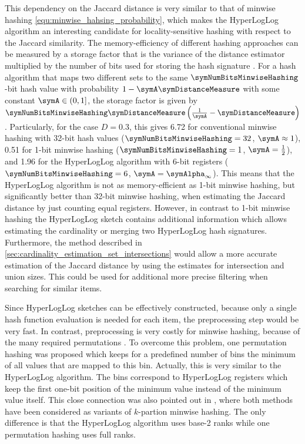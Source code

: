 \documentclass[a4paper]{scrartcl}
\begin{document}
This dependency on the Jaccard distance is very similar to that of minwise hashing \eqref{equ:minwise_hahsing_probability}, which makes the
HyperLogLog algorithm an interesting candidate for locality-sensitive hashing with respect to the Jaccard similarity. The memory-efficiency of different hashing approaches can be measured by a storage factor that is the variance of the distance estimator multiplied by the number of bits used for storing the hash signature \cite{Li2011}. For a hash algorithm that maps two different sets to the same $\symNumBitsMinwiseHashing$-bit hash value with probability $1-\symA\symDistanceMeasure$ with some constant $\symA\in(0,1]$, the storage factor is given by $\symNumBitsMinwiseHashing\symDistanceMeasure\left(\frac{1}{\symA}-\symDistanceMeasure\right)$. 
Particularly, for the case $D=0.3$, this gives \num{6.72} for conventional minwise hashing with 32-bit hash values ($\symNumBitsMinwiseHashing=32$, $\symA\approx 1$), \num{0.51} for 1-bit minwise hashing ($\symNumBitsMinwiseHashing=1$, $\symA=\frac{1}{2}$), and  \num{1.96} for the HyperLogLog algorithm with 6-bit registers ($\symNumBitsMinwiseHashing=6$, $\symA=\symAlpha_\infty$). This means that the HyperLogLog algorithm is not as memory-efficient as 1-bit minwise hashing, but significantly better than 32-bit minwise hashing, when estimating the Jaccard distance by just counting equal registers. However, in contrast to 1-bit minwise hashing the HyperLogLog sketch contains additional information which allows estimating the cardinality or merging two HyperLogLog hash signatures. Furthermore, the method described in \cref{sec:cardinality_estimation_set_intersections} would allow a more accurate estimation of the Jaccard distance by using the estimates for intersection and union sizes. This could be used for additional more precise filtering when searching for similar items.

Since HyperLogLog sketches can be effectively constructed, because only a single hash function evaluation is needed for each item, the preprocessing step would be very fast. In contrast, preprocessing is very costly for minwise hashing, because of the many required permutations \cite{Li2011}. To overcome this problem, one permutation hashing was proposed \cite{Li2012} which keeps for a predefined number of bins the minimum of all values that are mapped to this bin. Actually, this is very similar to the HyperLogLog algorithm. The bins correspond to HyperLogLog registers which keep the first one-bit position of the minimum value instead of the minimum value itself. This close connection was also pointed out in \cite{Cohen2014}, where both methods have been considered as variants of $k$-partion minwise hashing. The only difference is that the HyperLogLog algorithm uses base-2 ranks while one permutation hashing uses full ranks. 
\end{document}
